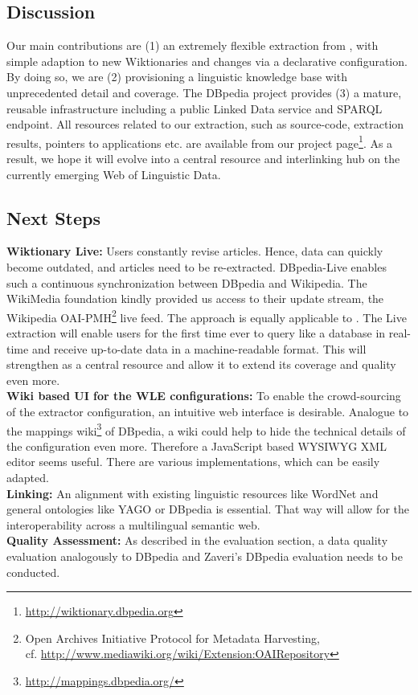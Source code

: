 \subsection{Discussion}
Our main contributions are (1) an extremely flexible extraction from \wik, with simple adaption to new Wiktionaries and changes via a declarative configuration. 
By doing so, we are (2) provisioning a linguistic knowledge base with unprecedented detail and coverage. 
The DBpedia project provides (3) a mature, reusable infrastructure including a public Linked Data service and SPARQL endpoint. All resources related to our \wik extraction, such as source-code, extraction results, pointers to applications etc. are available from our project page\footnote{\url{http://wiktionary.dbpedia.org}}.
As a result, we hope it will evolve into a central resource and interlinking hub on the currently emerging Web of Linguistic Data.

\subsection{Next Steps}
\textbf{Wiktionary Live:}
Users constantly revise articles.
Hence, data can quickly become outdated, and articles need to be re-extracted. DBpedia-Live enables such a continuous synchronization between DBpedia and Wikipedia.
The WikiMedia foundation kindly provided us access to their update stream, the Wikipedia OAI-PMH\footnote{Open Archives Initiative Protocol for Metadata Harvesting,\\
cf. \url{http://www.mediawiki.org/wiki/Extension:OAIRepository}} live feed.
The approach is equally applicable to \wik. 
The \wik Live extraction will enable users for the first time ever to query \wik like a database in real-time and receive up-to-date data in a machine-readable format.
This will strengthen \wik as a central resource and allow it to extend its coverage and quality even more.\\
\textbf{Wiki based UI for the WLE configurations:}
To enable the crowd-sourcing of the extractor configuration, an intuitive web interface is desirable. Analogue to the mappings wiki\footnote{\url{http://mappings.dbpedia.org/}} of DBpedia, a wiki could help to hide the technical details of the configuration even more. 
Therefore a JavaScript based WYSIWYG XML editor seems useful. 
There are various implementations, which can be easily adapted.\\
\textbf{Linking:}
An alignment with existing linguistic resources like WordNet and general ontologies like YAGO or DBpedia is essential. That way \wik will allow for the interoperability across a multilingual semantic web.\\
\textbf{Quality Assessment:}
As described in the evaluation section, a data quality evaluation analogously to DBpedia and Zaveri's DBpedia evaluation needs to be conducted.

